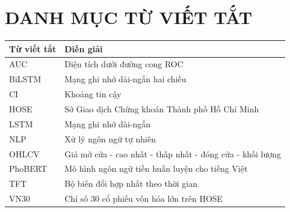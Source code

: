 \chapter*{DANH MỤC TỪ VIẾT TẮT}
\thispagestyle{empty}

\begin{longtable}{p{3cm} p{10.5cm}}
\toprule
Từ viết tắt & Diễn giải \\
\midrule
\endhead
AUC     & Diện tích dưới đường cong ROC \\
BiLSTM  & Mạng ghi nhớ dài-ngắn hai chiều \\
CI      & Khoảng tin cậy \\
HOSE    & Sở Giao dịch Chứng khoán Thành phố Hồ Chí Minh \\
LSTM    & Mạng ghi nhớ dài-ngắn \\
NLP     & Xử lý ngôn ngữ tự nhiên \\
OHLCV   & Giá mở cửa - cao nhất - thấp nhất - đóng cửa - khối lượng \\
PhoBERT & Mô hình ngôn ngữ tiền huấn luyện cho tiếng Việt \\
TFT     & Bộ biến đổi hợp nhất theo thời gian \\
VN30    & Chỉ số 30 cổ phiếu vốn hóa lớn trên HOSE \\
\bottomrule
\end{longtable}
